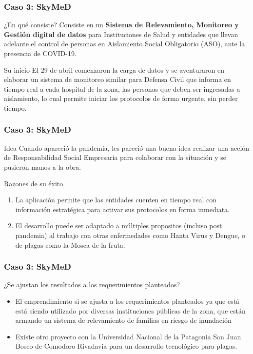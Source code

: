 \documentclass[11pt]{beamer}
\begin{document}
    \begin{frame}
    	\frametitle{Caso 3: SkyMeD}
    	\begin{block}{¿En qué consiste?}
    		 Consiste en un \textbf{Sistema de Relevamiento, Monitoreo y Gestión digital de datos} para Instituciones de Salud y entidades que llevan adelante el control de personas en Aislamiento Social Obligatorio (ASO), ante la presencia de COVID-19.
    	\end{block}
        \pause
        \begin{block}{Su inicio}
        	El 29 de abril comenzaron la carga de datos y se aventuraron en elaborar un sistema de monitoreo similar para Defensa Civil que informa en tiempo real a cada hospital de la zona, las personas que deben ser ingresadas a aislamiento, lo cual permite iniciar los protocolos de forma urgente, sin perder tiempo.
        \end{block}
    \end{frame}
   
    \begin{frame}
    	\frametitle{Caso 3: SkyMeD}
    	\begin{block}{Idea}
    		Cuando apareció la pandemia, les pareció una buena idea realizar una acción de Responsabilidad Social Empresaria para colaborar con la situación y se pusieron manos a la obra.
    	\end{block}
        \pause
    	\begin{block}{Razones de su éxito}
    		\begin{enumerate}
    			\item La aplicación permite que las entidades cuenten en tiempo real con información estratégica para activar sus protocolos en forma inmediata.
    			\pause
    			\item El desarrollo puede ser adaptado a múltiples propositos (incluso post pandemia) al trabajo con otras enfermedades como Hanta Virus y Dengue, o de plagas como la Mosca de la fruta.
    		\end{enumerate}
    	\end{block}
    \end{frame}

    \begin{frame}
    	\frametitle{Caso 3: SkyMeD}
    	\begin{block}{¿Se ajustan los resultados a los requerimientos planteados?}
    		\begin{itemize}
    			\item El emprendimiento si se ajusta a los requerimientos planteados ya que está está siendo utilizado por diversas instituciones públicas de la zona, que están armando un sistema de relevamiento de familias en riesgo de inundación
    			\item Existe otro proyecto con la Universidad Nacional de la Patagonia San Juan Bosco de Comodoro Rivadavia para un desarrollo tecnológico para plagas.
    		\end{itemize}
    	\end{block}
    \end{frame}
    
\end{document}
